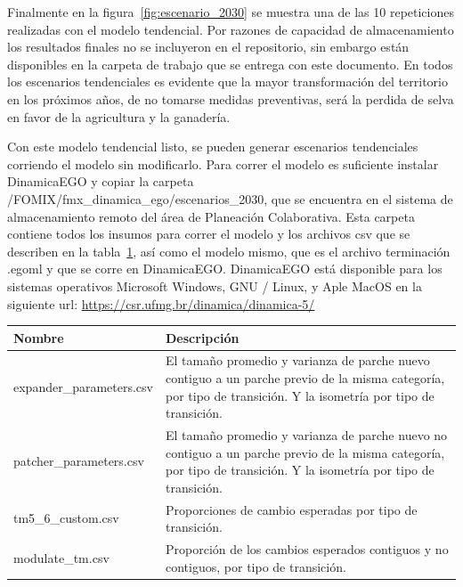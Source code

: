 \documentclass[12pt,a4paper,oldfontcommands]{article}
\begin{document}
Finalmente en la figura~\ref{fig:escenario_2030} se muestra una de las 10 repeticiones realizadas con el modelo tendencial. Por razones de capacidad de almacenamiento los resultados finales no se incluyeron en el repositorio, sin embargo están disponibles en la carpeta de trabajo que se entrega con este documento. En todos los escenarios tendenciales es evidente que la mayor transformación del territorio en los próximos años, de no tomarse medidas preventivas, será la perdida de selva en favor de la agricultura y la ganadería.

Con este modelo tendencial listo, se pueden generar escenarios tendenciales corriendo el modelo sin modificarlo. Para correr el modelo es suficiente instalar DinamicaEGO y copiar la carpeta /FOMIX/fmx\_dinamica\_ego/escenarios\_2030, que se encuentra en el sistema de almacenamiento remoto del área de Planeación Colaborativa. Esta carpeta contiene todos los insumos para correr el modelo y los archivos csv que se describen en la tabla~\ref{jugar}, así como el modelo mismo, que es el archivo terminación .egoml y que se corre en DinamicaEGO. DinamicaEGO está disponible para los sistemas operativos Microsoft Windows, GNU / Linux, y Aple MacOS en la siguiente url: \url{https://csr.ufmg.br/dinamica/dinamica-5/}



\bigskip
\begin{table}
\begin{center}	
\label{jugar}
\begin{tabular}{ l p{10cm} }
	Nombr{e} & D{e}scripción \\
	\midrule
	expander\_parameters.csv & El tamaño promedio y varianza de parche nuevo contiguo a un parche previo de la misma categoría, por tipo de transición. Y la isometría por tipo de transición.\\
	patcher\_parameters.csv & El tamaño promedio y varianza de parche nuevo no contiguo a un parche previo de la misma categoría, por tipo de transición. Y la isometría por tipo de transición. \\
	tm5\_6\_custom.csv & Proporciones de cambio esperadas por tipo de transición. \\
	modulate\_tm.csv & Proporción de los cambios esperados contiguos y no contiguos, por tipo de transición. 
\end{tabular}
\end{center} 
\end{table} \\
\end{document}
